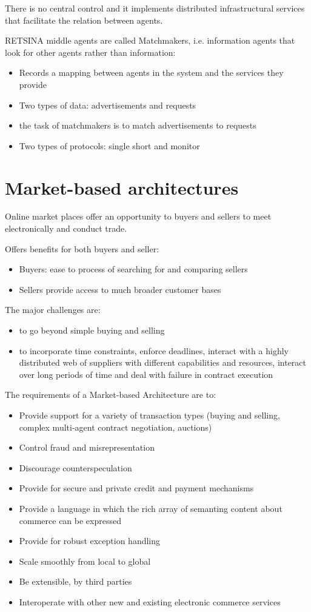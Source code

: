 There is no central control and it implements distributed infrastructural services that facilitate the relation between agents.

RETSINA middle agents are called Matchmakers, i.e. information agents that look for other agents rather than information:
\begin{itemize}
\item Records a mapping between agents in the system and the services they provide
\item Two types of data: advertisements and requests
\item the task of matchmakers is to match advertisements to requests
\item Two types of protocols: single short and monitor
\end{itemize}
\section{Market-based architectures}

Online market places offer an opportunity to buyers and sellers to meet electronically and conduct trade.

Offers benefits for both buyers and seller:
\begin{itemize}
\item Buyers: ease to process of searching for and comparing sellers
\item Sellers provide access to much broader customer bases
\end{itemize}
The major challenges are:
\begin{itemize}
\item to go beyond simple buying and selling
\item to incorporate time constraints, enforce deadlines, interact with a highly distributed web of suppliers with different capabilities and resources, interact over long periods of time and deal with failure in contract execution
\end{itemize}
The requirements of a Market-based Architecture are to:
\begin{itemize}
\item Provide support for a variety of transaction types (buying and selling, complex multi-agent contract negotiation, auctions)
\item Control fraud and misrepresentation
\item Discourage counterspeculation
\item Provide for secure and private credit and payment mechanisms
\item Provide a language in which the rich array of semanting content about commerce can be expressed
\item Provide for robust exception handling
\item Scale smoothly from local to global
\item Be extensible, by third parties
\item Interoperate with other new and existing electronic commerce services
\end{itemize}
